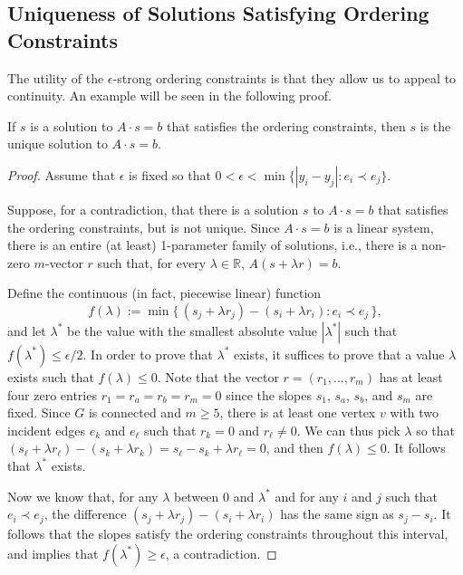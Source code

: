 \subsection{Uniqueness of Solutions Satisfying Ordering Constraints}

The utility of the $\epsilon$-strong ordering constraints is that they
allow us to appeal to continuity. 
An example will be seen in the following proof.

\begin{lem}
	If $s$ is a solution to $A\cdot s=b$ that satisfies the ordering
	constraints, %
	then $s$ is 
	the unique solution to $A\cdot s=b$.
\end{lem}

\begin{proof}
	Assume that $\epsilon$ is fixed so that $0<\epsilon<\min\{|y_i-y_j| : e_i\prec e_j\}$.
	
	Suppose, for a contradiction, that there is a solution $s$ to $A\cdot s=b$ that satisfies the ordering
	constraints, %
	but is not unique.  Since $A\cdot s=b$ is a linear system, there is an entire (at least) 1-parameter family of solutions,
	i.e., there is a non-zero $m$-vector $r$ such that, for every
	$\lambda\in\mathbb R$, $A(s+\lambda r)=b$.
	
	
	Define the continuous (in fact, piecewise linear) function
	\begin{equation*}
	f(\lambda) := \min \{\, (s_j+\lambda r_j)-(s_i+\lambda r_i) : e_i \prec
	e_j\,\}
	,
	\end{equation*}
	and let $\lambda^*$ be the value with the smallest absolute value
	$|\lambda^*|$ such that
	$f(\lambda^*)\le\epsilon/2$. In order to prove that $\lambda^*$ exists, it suffices to prove that a value $\lambda$ exists such that $f(\lambda)\le 0$. Note that the vector $r=(r_1,\ldots,r_m)$ has at least four zero entries
	$r_1=r_a=r_b=r_m=0$ since the slopes $s_1$, $s_a$, $s_b$, and $s_m$
	are fixed.
	Since $G$ is connected and $m\geq 5$, there is at least one vertex $v$ with two incident edges $e_k$
	and $e_\ell$ such that $r_k=0$ and $r_\ell\neq 0$. 
	We can thus pick $\lambda$ so that $(s_\ell+\lambda r_\ell)-(s_k+\lambda r_k)=s_\ell-s_k+\lambda r_\ell=0$,
	and then $f(\lambda)\le 0$. It follows that $\lambda^*$ exists.
	
	Now we know that, for any $\lambda$ between $0$ and $\lambda^*$ and for any $i$ and $j$ such that $e_i\prec e_j$, the difference $(s_j+\lambda r_j)-(s_i+\lambda r_i)$ has the same sign as $s_j-s_i$. It follows that the slopes satisfy the ordering constraints throughout
	this interval, and
	 implies that $f(\lambda^*)\ge\epsilon$, a contradiction.
\end{proof}

